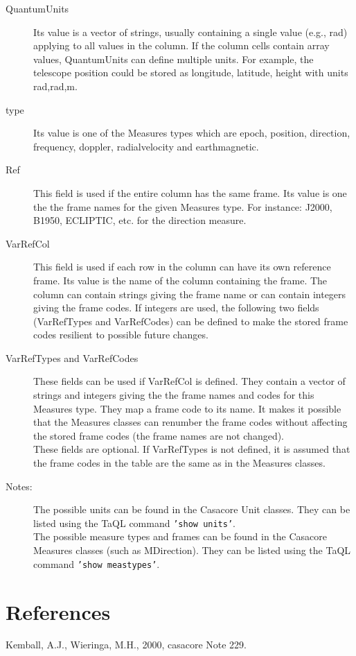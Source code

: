 \documentclass{article}
\begin{document}
\begin{description}

\item[QuantumUnits] Its value is a vector of strings, usually
containing a single value (e.g., rad) applying to all values in the
column. If the column cells contain array values,
QuantumUnits can define multiple units. For example, the telescope
position could be stored as longitude, latitude, height with units rad,rad,m.

\item[type] Its value is one of the Measures types which are
epoch, position, direction, frequency, doppler, radialvelocity and
earthmagnetic.

\item[Ref] This field is used if the entire column has the same frame.
Its value is one the the frame names for the given Measures
type. For instance: J2000, B1950, ECLIPTIC, etc. for the direction
measure.

\item[VarRefCol] This field is used if each row in the column can have
its own reference frame. Its value is the name of the column
containing the frame. The column can contain strings giving the frame
name or can contain integers giving the frame codes. If integers are
used, the following two fields (VarRefTypes and VarRefCodes) can be
defined to make the stored frame codes resilient to possible future
changes.

\item[VarRefTypes and VarRefCodes] These fields can be used if
VarRefCol is defined. They contain a vector of
strings and integers  giving the the frame names and codes for this Measures type.
They map a frame code to its name.  It makes it possible that the
Measures classes can renumber the frame codes without affecting the
stored frame codes (the frame names are not changed).
\\These fields are optional. If VarRefTypes is not defined, it is assumed that the frame
codes in the table are the same as in the Measures classes.

\item[Notes:]
The possible units can be found in the Casacore Unit classes. They
can be listed using the TaQL command {\tt 'show units'}.
\\The possible measure types and frames can be found in the Casacore
Measures classes (such as MDirection). They
can be listed using the TaQL command {\tt 'show meastypes'}.

\end{description}

\section{References}

\noindent Kemball, A.J., Wieringa, M.H., 2000, casacore Note 229.
\end{document}
